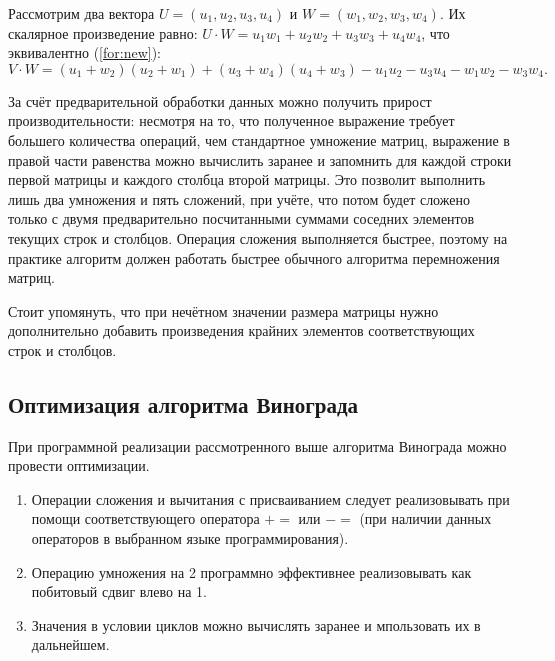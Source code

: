 Рассмотрим два вектора $U = (u_1, u_2, u_3, u_4)$ и $W = (w_1, w_2, w_3, w_4)$.
Их скалярное произведение равно: $U \cdot W = u_1w_1 + u_2w_2 + u_3w_3 + u_4w_4$, что эквивалентно (\ref{for:new}):
\begin{equation}
	\label{for:new}
	V \cdot W = (u_1 + w_2)(u_2 + w_1) + (u_3 + w_4)(u_4 + w_3) - u_1u_2 - u_3u_4 - w_1w_2 - w_3w_4.
\end{equation}

За счёт предварительной обработки данных можно получить прирост производительности: несмотря на то, что  полученное выражение требует большего количества операций, чем стандартное умножение матриц, выражение в правой части равенства можно вычислить заранее и запомнить для каждой строки первой матрицы и каждого столбца второй матрицы. 
Это позволит выполнить лишь два умножения и пять сложений, при учёте, что потом будет сложено только с двумя предварительно посчитанными суммами соседних элементов текущих строк и столбцов. 
Операция сложения выполняется быстрее, поэтому на практике алгоритм должен работать быстрее обычного алгоритма перемножения матриц.

Стоит упомянуть, что при нечётном значении размера матрицы нужно дополнительно добавить произведения крайних элементов соответствующих строк и столбцов.

\subsection{Оптимизация алгоритма Винограда}

При программной реализации рассмотренного выше алгоритма Винограда можно провести оптимизации.
\begin{enumerate}
	\item Операции сложения и вычитания с присваиванием следует реализовывать при помощи соответствующего оператора $+=$ или $-=$ (при наличии данных операторов в выбранном языке программирования).
	\item Операцию умножения на 2 программно эффективнее реализовывать как побитовый сдвиг влево на 1.
	\item Значения в условии циклов можно вычислять заранее и мпользовать их в дальнейшем.
\end{enumerate}